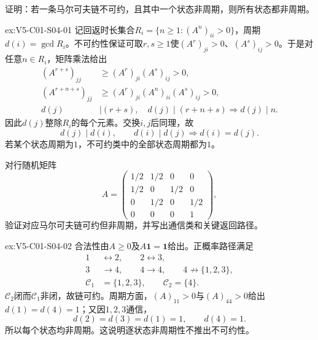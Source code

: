 \begin{SLChapterExercisePairSection}

\SLSourceBookExercises

\begin{exercise}\label{ex:V5-C01-S04-01}
证明：若一条马尔可夫链不可约，且其中一个状态非周期，则所有状态都非周期。
\end{exercise}
\ifSLFullEdition
{}\label{sol:V5-C01-S04-01}
\begin{chapterexercisesolution}{ex:V5-C01-S04-01}
记回返时长集合$R_i=\{n\ge1:(A^n)_{ii}>0\}$，周期$d(i)=\gcd R_i$。不可约性保证可取$r,s\ge1$使$(A^r)_{ji}>0$、$(A^s)_{ij}>0$。于是对任意$n\in R_i$，矩阵乘法给出
\[
\begin{aligned}
(A^{r+s})_{jj}&\ge (A^r)_{ji}(A^s)_{ij}>0,\\
(A^{r+n+s})_{jj}&\ge (A^r)_{ji}(A^n)_{ii}(A^s)_{ij}>0,\\
d(j)&\mid(r+s),\quad d(j)\mid(r+n+s)
\Longrightarrow d(j)\mid n.
\end{aligned}
\]
因此$d(j)$整除$R_i$的每个元素。交换$i,j$后同理，故
\[
d(j)\mid d(i),\qquad d(i)\mid d(j)
\Longrightarrow d(i)=d(j).
\]
若某个状态周期为$1$，不可约类中的全部状态周期都为$1$。
\end{chapterexercisesolution}
\fi

\begin{exercise}\label{ex:V5-C01-S04-02}
对行随机矩阵
\[
A=\begin{pmatrix}
1/2&1/2&0&0\\
1/2&0&1/2&0\\
0&1/2&0&1/2\\
0&0&0&1
\end{pmatrix},
\]
验证对应马尔可夫链可约但非周期，并写出通信类和关键返回路径。
\end{exercise}
\ifSLFullEdition
{}\label{sol:V5-C01-S04-02}
\begin{chapterexercisesolution}{ex:V5-C01-S04-02}
合法性由$A\ge0$及$A\boldsymbol1=\boldsymbol1$给出。正概率路径满足
\[
\begin{aligned}
1&\leftrightarrow2,\qquad 2\leftrightarrow3,\\
3&\to4,\qquad 4\to4,\qquad 4\not\to\{1,2,3\},\\
\mathcal C_1&=\{1,2,3\},\qquad \mathcal C_2=\{4\}.
\end{aligned}
\]
$\mathcal C_2$闭而$\mathcal C_1$非闭，故链可约。周期方面，$(A)_{11}>0$与$(A)_{44}>0$给出$d(1)=d(4)=1$；又因$1,2,3$通信，
\[
d(2)=d(3)=d(1)=1,\qquad d(4)=1.
\]
所以每个状态均非周期。这说明逐状态非周期性不推出不可约性。
\end{chapterexercisesolution}
\fi


\end{SLChapterExercisePairSection}

